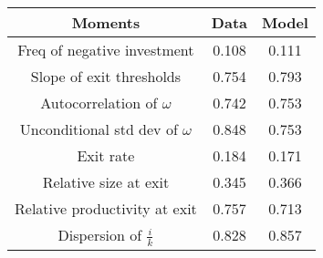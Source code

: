 \begin{table}[H] 
{\fontshape\scdefault\selectfont 
		\begin{center} 
			\begin{tabular}{ccc} 
				\hline\hline 
				Moments	& Data & Model \\ 
				\hline 
				Freq of negative investment & 0.108 &0.111\\ 
				Slope of exit thresholds & 0.754 &0.793\\ 
				Autocorrelation of $\omega$ & 0.742 &0.753\\ 
				Unconditional std dev of $\omega$ & 0.848 &0.753\\ 
				Exit rate & 0.184 &0.171\\ 
				Relative size at exit & 0.345 &0.366\\ 
				Relative productivity at exit & 0.757 &0.713\\ 
				Dispersion of $\frac{i}{k}$ & 0.828 &0.857\\ 
				\hline\hline 
			\end{tabular} 
	\end{center}} 
	\label{tab:moments-baseline} 
\end{table} 
